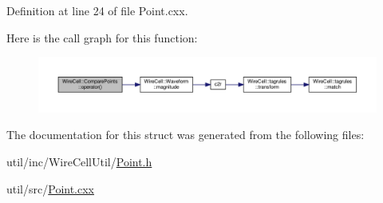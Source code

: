 Definition at line 24 of file Point.\+cxx.

Here is the call graph for this function\+:
\nopagebreak
\begin{figure}[H]
\begin{center}
\leavevmode
\includegraphics[width=350pt]{struct_wire_cell_1_1_compare_points_ae6ab32afd52b312e3d452e68996fca76_cgraph}
\end{center}
\end{figure}


The documentation for this struct was generated from the following files\+:\begin{DoxyCompactItemize}
\item 
util/inc/\+Wire\+Cell\+Util/\hyperlink{_point_8h}{Point.\+h}\item 
util/src/\hyperlink{_point_8cxx}{Point.\+cxx}\end{DoxyCompactItemize}
